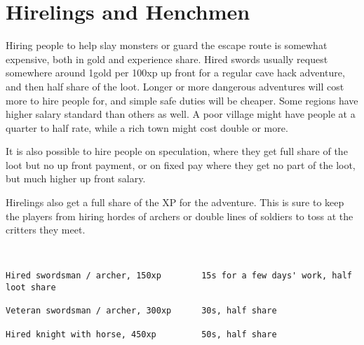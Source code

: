 \goodbreak
{}
\section*{Hirelings and Henchmen}
Hiring people to help slay monsters or guard the escape route is somewhat expensive, both in gold and experience share. Hired swords usually request somewhere around 1gold per 100xp up front for a regular cave hack adventure, and then half share of the loot. Longer or more dangerous adventures will cost more to hire people for, and simple safe duties will be cheaper. Some regions have higher salary standard than others as well. A poor village might have people at a quarter to half rate, while a rich town might cost double or more.

It is also possible to hire people on speculation, where they get full share of the loot but no up front payment, or on fixed pay where they get no part of the loot, but much higher up front salary.

Hirelings also get a full share of the XP for the adventure. This is sure to keep the players from hiring hordes of archers or double lines of soldiers to toss at the critters they meet.

\

\small \begin{verbatim}
Hired swordsman / archer, 150xp        15s for a few days' work, half loot share

Veteran swordsman / archer, 300xp      30s, half share

Hired knight with horse, 450xp         50s, half share
\end{verbatim} \normalsize

